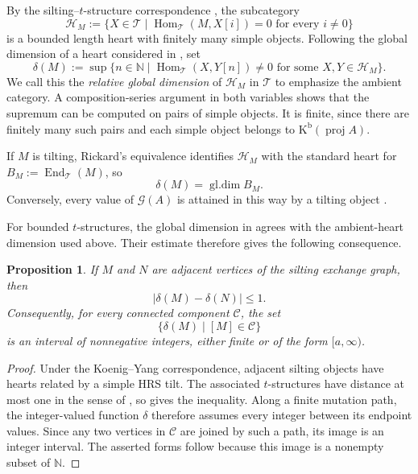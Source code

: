 \documentclass[11pt]{amsart}
\theoremstyle{definition}
\theoremstyle{plain}
\newtheorem{proposition}[proposition]{Proposition}
\theoremstyle{definition}
\theoremstyle{definition}
\newcommand{\Kb}{\mathrm K^{\mathrm b}}
\newcommand{\proj}{\operatorname{proj}}
\newcommand{\gldim}{\operatorname{gl.dim}}
\newcommand{\Hom}{\operatorname{Hom}}
\newcommand{\GSpec}{\mathcal G}
\newcommand{\NN}{\mathbb N}
\newcommand{\cH}{\mathcal H}
\newcommand{\cT}{\mathcal T}
\begin{document}
By the silting--$t$-structure correspondence
\cite{KoenigYang}, the subcategory
\[
 \cH_M:=\{X\in\cT\mid
 \Hom_{\cT}(M,X[i])=0\text{ for every }i\neq0\}
\]
is a bounded length heart with finitely many simple
objects. Following the global dimension of a heart
considered in \cite[Remark~5.5]{IkedaQiu}, set
\begin{equation}
\label{eq:delta-definition}
 \delta(M):=
 \sup\{n\in\NN\mid
 \Hom_{\cT}(X,Y[n])\neq0
 \text{ for some }X,Y\in\cH_M\}.
\end{equation}
We call this the \emph{relative global dimension} of
$\cH_M$ in $\cT$ to emphasize the ambient category.
A composition-series argument in both variables shows
that the supremum can be computed on pairs of simple
objects. It is finite, since there are finitely many
such pairs and each simple object belongs to
$\Kb(\proj A)$.

If $M$ is tilting, Rickard's equivalence identifies
$\cH_M$ with the standard heart for
$B_M:=\operatorname{End}_{\cT}(M)$, so
\[
 \delta(M)=\gldim B_M.
\]
Conversely, every value of $\GSpec(A)$ is attained in
this way by a tilting object \cite{Rickard}.

For bounded $t$-structures, the global dimension in
\cite[Definition~3.3]{ChenLinZhou} agrees with the
ambient-heart dimension used above. Their estimate
therefore gives the following consequence.

\begin{proposition}
\label{prop:silting-dimension-interval}
If $M$ and $N$ are adjacent vertices of the silting
exchange graph, then
\[
 |\delta(M)-\delta(N)|\leq1.
\]
Consequently, for every connected component $\mathscr C$,
the set
\[
 \{\delta(M)\mid[M]\in\mathscr C\}
\]
is an interval of nonnegative integers, either finite
or of the form $[a,\infty)$.
\end{proposition}

\begin{proof}
Under the Koenig--Yang correspondence, adjacent
silting objects have hearts related by a simple HRS
tilt. The associated $t$-structures have distance
at most one in the sense of
\cite[Definition~4.2]{ChenLinZhou}, so
\cite[Lemma~4.6(4)]{ChenLinZhou} gives the inequality.
Along a finite mutation path, the integer-valued
function $\delta$ therefore assumes every integer
between its endpoint values. Since any two vertices
in $\mathscr C$ are joined by such a path, its image
is an integer interval. The asserted forms follow
because this image is a nonempty subset of $\NN$.
\end{proof}
\end{document}
